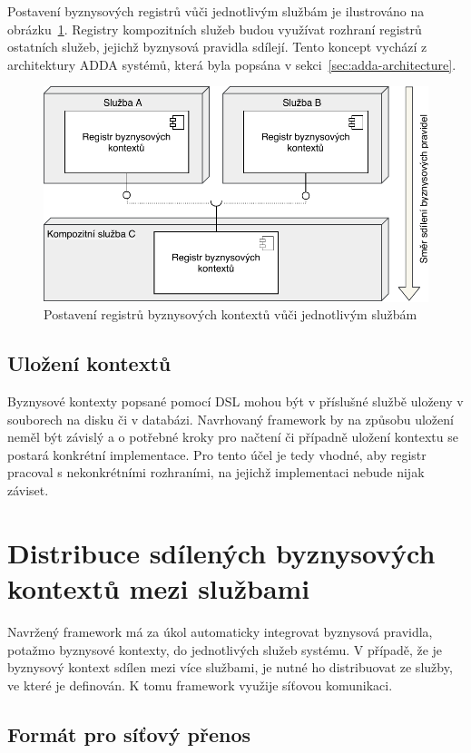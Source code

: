 Postavení byznysových registrů vůči jednotlivým službám je ilustrováno na obrázku~\ref{fig:layers-vs-framework}.
Registry kompozitních služeb budou využívat rozhraní registrů ostatních služeb, jejichž byznysová
pravidla sdílejí. Tento koncept vychází z architektury \gls{ADDA} systémů, která byla popsána v sekci~\ref{sec:adda-architecture}.

\begin{figure}
    \centering
    \includegraphics[keepaspectratio=true, width=0.7\linewidth]{figures/layers-vs-framework.pdf}
    \caption{Postavení registrů byznysových kontextů vůči jednotlivým službám}
    \label{fig:layers-vs-framework}
\end{figure}

\subsection{Uložení kontextů}

Byznysové kontexty popsané pomocí \gls{DSL} mohou být v příslušné službě uloženy v souborech na disku či v
databázi. Navrhovaný framework by na způsobu uložení neměl být závislý a o potřebné kroky
pro načtení či případně uložení kontextu se postará konkrétní implementace. Pro tento účel
je tedy vhodné, aby registr pracoval s nekonkrétními rozhraními, na jejichž implementaci
nebude nijak záviset.

\section{Distribuce sdílených byznysových kontextů mezi službami}

Navržený framework má za úkol automaticky integrovat byznysová pravidla, potažmo byznysové kontexty,
do jednotlivých služeb systému. V případě, že je byznysový kontext sdílen mezi více službami, je
nutné ho distribuovat ze služby, ve které je definován. K tomu framework využije síťovou komunikaci.

\subsection{Formát pro síťový přenos}

